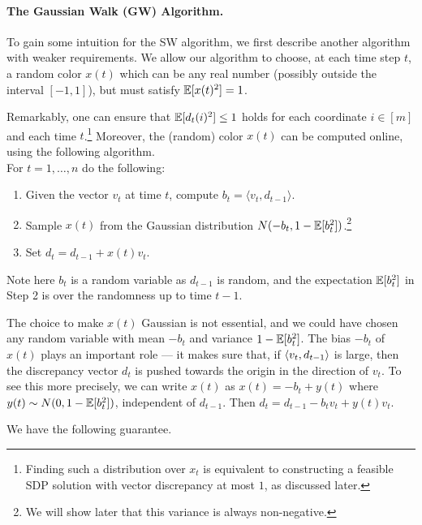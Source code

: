 \paragraph{The Gaussian Walk (GW) Algorithm.} To gain some intuition for the SW algorithm, we first describe another algorithm with weaker requirements.  We allow our algorithm to choose, at each time step $t$, a random color $x(t)$ which can be any real number (possibly outside the interval $[-1,1]$), but must satisfy $\mathbb{E}[x(t)^2] = 1$. 

Remarkably, one can ensure that $\mathbb{E}[d_t(i)^2] \le 1$ holds for each coordinate $i \in [m]$ and each time $t$.\footnote{Finding such a distribution over $x_t$ is equivalent to constructing a feasible SDP solution with vector discrepancy at most $1$, as discussed later.} Moreover, the (random) color $x(t)$ can be computed online, using the following algorithm.\\

\noindent For $t=1,\ldots,n$ do the following:
\begin{enumerate}
    \item Given the vector $v_t$ at time $t$, compute
    \(
        b_t =\langle v_t, d_{t-1} \rangle.
    \)
    \item Sample $x(t)$ from the Gaussian distribution $N(-b_t, 1-\mathbb{E}[b_t^2])$.\footnote{We will show later that this variance is always non-negative.}
    \item Set $d_t = d_{t-1} + x(t) v_t$.
\end{enumerate}

Note here $b_t$ is a random variable as $d_{t-1}$ is random, and the expectation $\mathbb{E}[b_t^2]$ in Step 2
 is over the randomness up to time $t-1$. 
 
 The choice to make $x(t)$ Gaussian is not essential, and we could have chosen any random variable with mean $-b_t$ and variance $1-\mathbb{E}[b_t^2]$. The bias $-b_t$ of $x(t)$ plays an important role --- it makes sure that, if $\langle v_t, d_{t-1}\rangle$ is large, then the discrepancy vector $d_t$ is pushed towards the origin in the direction of $v_t$. To see this more precisely, we can write $x(t)$ as $x(t) = -b_t + y(t)$ where $y(t)\sim N(0, 1-\mathbb{E}[b_t^2])$, independent of $d_{t-1}$. Then $d_t = d_{t-1} -b_tv_t + y(t) v_t$.

We have the following guarantee.

